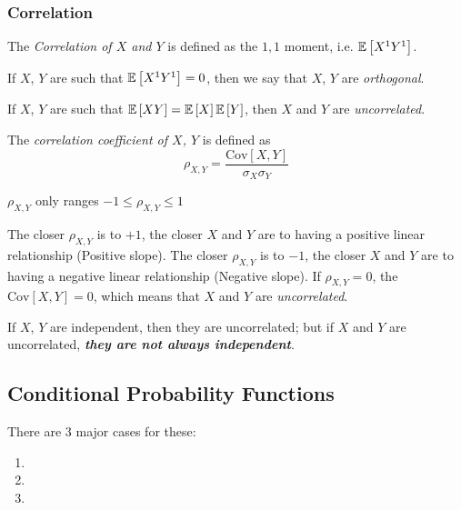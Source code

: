 		\subsubsection{Correlation} \label{subsubsec:Correlation}
			\begin{definition}[Correlation] \label{def:Correlation}
				The \emph{Correlation of $X$ and $Y$} is defined as the $1,1$ moment, i.e. $\operatorname{\mathbb{E}} \left[ X^{1} Y^{1} \right]$.
				\begin{remark}
					If $X$, $Y$ are such that $\operatorname{\mathbb{E}} \left[ X^{1} Y^{1} \right] = 0$, then we say that $X$, $Y$ are \emph{orthogonal}.
				\end{remark}
				\begin{remark}
					If $X$, $Y$ are such that $\operatorname{\mathbb{E}} \left[ XY \right] = \operatorname{\mathbb{E}} \left[ X \right] \operatorname{\mathbb{E}} \left[ Y \right]$, then $X$ and $Y$ are \emph{uncorrelated}.
				\end{remark}
			\end{definition}
			\begin{definition} \label{def:Correlation Coefficient}
				The \emph{correlation coefficient of $X$, $Y$} is defined as
				\begin{equation} \label{eq:Correlation Coefficient}
				\rho_{X,Y} = \frac{\text{Cov} \left[ X,Y \right]}{\sigma_{X} \sigma_{Y}}
				\end{equation}
				\begin{remark}
					$\rho_{X,Y}$ only ranges $-1 \leq \rho_{X,Y} \leq 1$
				\end{remark}
				\begin{remark}
					The closer $\rho_{X,Y}$ is to $+1$, the closer $X$ and $Y$ are to having a positive linear relationship (Positive slope). \newline
					The closer $\rho_{X,Y}$ is to $-1$, the closer $X$ and $Y$ are to having a negative linear relationship (Negative slope). \newline
					If $\rho_{X,Y} = 0$, the $\text{Cov}\left[ X,Y \right] = 0$, which means that $X$ and $Y$ are \emph{uncorrelated}.
				\end{remark}
				\begin{remark}
					If $X$, $Y$ are independent, then they are uncorrelated; but if $X$ and $Y$ are uncorrelated, \emph{\textbf{they are not always independent}}.
				\end{remark}
			\end{definition}
		
		\subsection{Conditional Probability Functions} \label{subsec:Multiple Variable Conditional Probability Functions}
		There are 3 major cases for these:
			\begin{enumerate}
				\item {}
				\item {}
				\item {}
			\end{enumerate}
					
